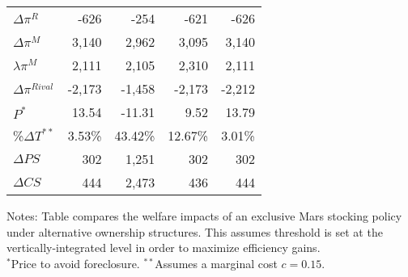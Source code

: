 \documentclass[aspectratio=169]{beamer}
\begin{document}
\begin{frame}
\begin{table}[htbp]
\begin{center}
\begin{tabular}{|l | rrrr|}
 $\Delta \pi^R$ & -626 & -254 & -621 & -626 \\
$\Delta \pi^M$ & 3,140 & 2,962 & 3,095 & 3,140 \\
$\lambda \pi^M$ & 2,111 & 2,105 & 2,310 & 2,111 \\
$\Delta \pi^{Rival}$ & -2,173 & -1,458 & -2,173 & -2,212 \\ 
\hline
$P^*$ & 13.54 & -11.31 & 9.52 & 13.79 \\
\%$\Delta T^{**}$ & 3.53\% & 43.42\% & 12.67\% & 3.01\% \\
\hline
    $\Delta PS$  & 302   & 1,251 & 302   & 302 \\
    $\Delta CS$ & 444   & 2,473 & 436   & 444 \\
\hline
    \end{tabular}
\end{center}
\tiny
Notes: Table compares the welfare impacts of an exclusive Mars stocking policy under alternative ownership structures. This assumes threshold is set at the vertically-integrated level in order to maximize efficiency gains.\\
$^*$Price to avoid foreclosure.
$^{**}$Assumes a marginal cost $c=0.15.$\\
\end{table}
\end{frame}
\end{document}

